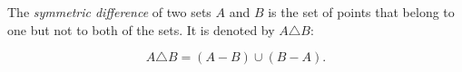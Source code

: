 The \textit{symmetric difference} of two sets $A$ and $B$ is the set of points that belong to one but not to both of the sets. It is denoted by $A \triangle B$:

$$
A \triangle B = (A - B) \cup (B - A).
$$
